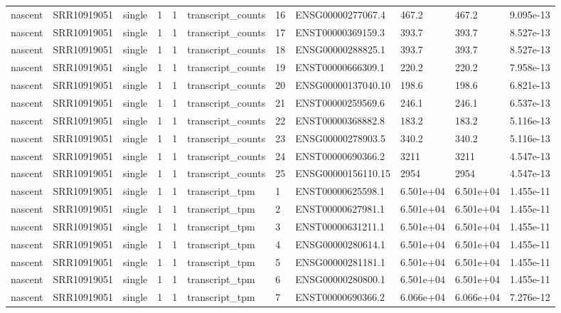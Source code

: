 \begin{tabular}{lllllllllll}
nascent & SRR10919051 & single & 1 & 1 & transcript\_counts & 16 & ENSG00000277067.4 & 467.2 & 467.2 & 9.095e-13 \\
nascent & SRR10919051 & single & 1 & 1 & transcript\_counts & 17 & ENST00000369159.3 & 393.7 & 393.7 & 8.527e-13 \\
nascent & SRR10919051 & single & 1 & 1 & transcript\_counts & 18 & ENSG00000288825.1 & 393.7 & 393.7 & 8.527e-13 \\
nascent & SRR10919051 & single & 1 & 1 & transcript\_counts & 19 & ENST00000666309.1 & 220.2 & 220.2 & 7.958e-13 \\
nascent & SRR10919051 & single & 1 & 1 & transcript\_counts & 20 & ENSG00000137040.10 & 198.6 & 198.6 & 6.821e-13 \\
nascent & SRR10919051 & single & 1 & 1 & transcript\_counts & 21 & ENST00000259569.6 & 246.1 & 246.1 & 6.537e-13 \\
nascent & SRR10919051 & single & 1 & 1 & transcript\_counts & 22 & ENST00000368882.8 & 183.2 & 183.2 & 5.116e-13 \\
nascent & SRR10919051 & single & 1 & 1 & transcript\_counts & 23 & ENSG00000278903.5 & 340.2 & 340.2 & 5.116e-13 \\
nascent & SRR10919051 & single & 1 & 1 & transcript\_counts & 24 & ENST00000690366.2 & 3211 & 3211 & 4.547e-13 \\
nascent & SRR10919051 & single & 1 & 1 & transcript\_counts & 25 & ENSG00000156110.15 & 2954 & 2954 & 4.547e-13 \\
nascent & SRR10919051 & single & 1 & 1 & transcript\_tpm & 1 & ENST00000625598.1 & 6.501e+04 & 6.501e+04 & 1.455e-11 \\
nascent & SRR10919051 & single & 1 & 1 & transcript\_tpm & 2 & ENST00000627981.1 & 6.501e+04 & 6.501e+04 & 1.455e-11 \\
nascent & SRR10919051 & single & 1 & 1 & transcript\_tpm & 3 & ENST00000631211.1 & 6.501e+04 & 6.501e+04 & 1.455e-11 \\
nascent & SRR10919051 & single & 1 & 1 & transcript\_tpm & 4 & ENSG00000280614.1 & 6.501e+04 & 6.501e+04 & 1.455e-11 \\
nascent & SRR10919051 & single & 1 & 1 & transcript\_tpm & 5 & ENSG00000281181.1 & 6.501e+04 & 6.501e+04 & 1.455e-11 \\
nascent & SRR10919051 & single & 1 & 1 & transcript\_tpm & 6 & ENSG00000280800.1 & 6.501e+04 & 6.501e+04 & 1.455e-11 \\
nascent & SRR10919051 & single & 1 & 1 & transcript\_tpm & 7 & ENST00000690366.2 & 6.066e+04 & 6.066e+04 & 7.276e-12 \\

\end{tabular}
